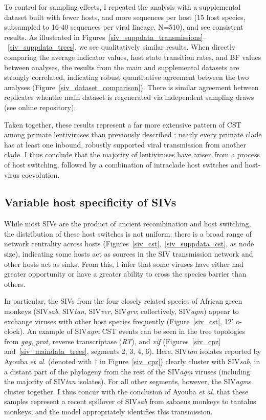 To control for sampling effects, I repeated the analysis with a supplemental dataset built with fewer hosts, and more sequences per host (15 host species, subsampled to 16-40 sequences per viral lineage, N=510), and see consistent results.
As illustrated in Figures~\ref{siv_suppdata_transmissions}--~\ref{siv_suppdata_trees}, we see qualitatively similar results.
When directly comparing the average indicator values, host state transition rates, and BF values between analyses, the results from the main and supplemental datasets are strongly correlated, indicating robust quantitative agreement between the two analyses (Figure~\ref{siv_dataset_comparison}).
There is similar agreement between replicates whenthe main dataset is regenerated via independent sampling draws (see online repository).

Taken together, these results represent a far more extensive pattern of CST among primate lentiviruses than previously described \citep{apetrei2004history,sharp2011origins}; nearly every primate clade has at least one inbound, robustly supported viral transmission from another clade.
I thus conclude that the majority of lentiviruses have arisen from a process of host switching, followed by a combination of intraclade host switches and host-virus coevolution.

\subsection{Variable host specificity of SIVs}
While most SIVs are the product of ancient recombination and host switching, the distribution of these host switches is not uniform; there is a broad range of network centrality across hosts (Figures~\ref{siv_cst},~\ref{siv_suppdata_cst}, as node size), indicating some hosts act as sources in the SIV transmission network and other hosts act as sinks.
From this, I infer that some viruses have either had greater opportunity or have a greater ability to cross the species barrier than others.

In particular, the SIVs from the four closely related species of African green monkeys (SIV\textit{sab}, SIV\textit{tan}, SIV\textit{ver}, SIV\textit{grv}; collectively, SIV\textit{agm}) appear to exchange viruses with other host species frequently (Figure~\ref{siv_cst}, 12’ o-clock).
An example of SIV\textit{agm} CST events can be seen in the tree topologies from \textit{gag}, \textit{prot}, reverse transcriptase (\textit{RT}), and \textit{vif} (Figures~\ref{siv_cpz} and~\ref{siv_maindata_trees}, segments 2, 3, 4, 6).
Here, SIV\textit{tan} isolates reported by Ayouba \textit{et al}. \citep{ayouba2015molecular} (denoted with $\dagger$ in Figure~\ref{siv_cpz}) clearly cluster with SIV\textit{sab}, in a distant part of the phylogeny from the rest of the SIV\textit{agm} viruses (including the majority of SIV\textit{tan} isolates).
For all other segments, however, the SIV\textit{agm}s cluster together.
I thus concur with the conclusion of Ayouba \textit{et al}. that these samples represent a recent spillover of SIV\textit{sab} from sabaeus monkeys to tantalus monkeys, and the model appropriately identifies this transmission.

